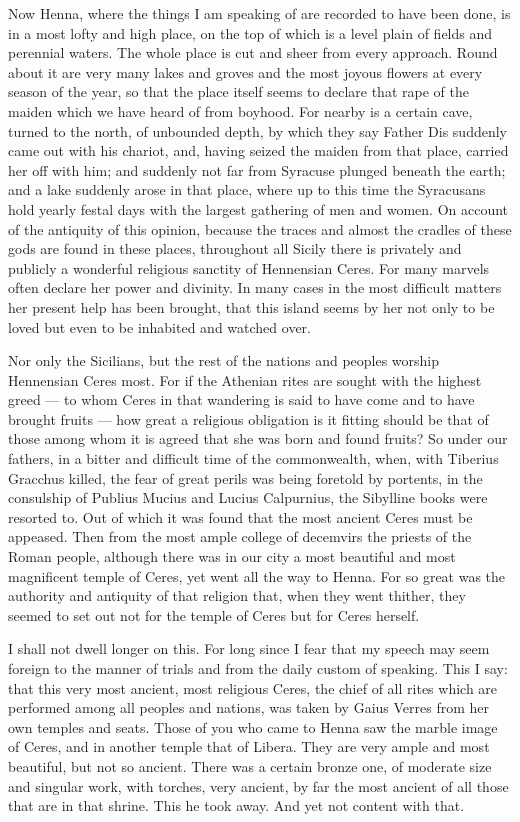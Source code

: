  Now Henna, where the things I am speaking of are recorded to have been done, is in a most lofty and high place, on the top of which is a level plain of fields and perennial waters. The whole place is cut and sheer from every approach. Round about it are very many lakes and groves and the most joyous flowers at every season of the year, so that the place itself seems to declare that rape of the maiden which we have heard of from boyhood. For nearby is a certain cave, turned to the north, of unbounded depth, by which they say Father Dis suddenly came out with his chariot, and, having seized the maiden from that place, carried her off with him; and suddenly not far from Syracuse plunged beneath the earth; and a lake suddenly arose in that place, where up to this time the Syracusans hold yearly festal days with the largest gathering of men and women. On account of the antiquity of this opinion, because the traces and almost the cradles of these gods are found in these places, throughout all Sicily there is privately and publicly a wonderful religious sanctity of Hennensian Ceres. For many marvels often declare her power and divinity. In many cases in the most difficult matters her present help has been brought, that this island seems by her not only to be loved but even to be inhabited and watched over.

 Nor only the Sicilians, but the rest of the nations and peoples worship Hennensian Ceres most. For if the Athenian rites are sought with the highest greed --- to whom Ceres in that wandering is said to have come and to have brought fruits --- how great a religious obligation is it fitting should be that of those among whom it is agreed that she was born and found fruits? So under our fathers, in a bitter and difficult time of the commonwealth, when, with Tiberius Gracchus killed, the fear of great perils was being foretold by portents, in the consulship of Publius Mucius and Lucius Calpurnius, the Sibylline books were resorted to. Out of which it was found that the most ancient Ceres must be appeased. Then from the most ample college of decemvirs the priests of the Roman people, although there was in our city a most beautiful and most magnificent temple of Ceres, yet went all the way to Henna. For so great was the authority and antiquity of that religion that, when they went thither, they seemed to set out not for the temple of Ceres but for Ceres herself.

 I shall not dwell longer on this. For long since I fear that my speech may seem foreign to the manner of trials and from the daily custom of speaking. This I say: that this very most ancient, most religious Ceres, the chief of all rites which are performed among all peoples and nations, was taken by Gaius Verres from her own temples and seats. Those of you who came to Henna saw the marble image of Ceres, and in another temple that of Libera. They are very ample and most beautiful, but not so ancient. There was a certain bronze one, of moderate size and singular work, with torches, very ancient, by far the most ancient of all those that are in that shrine. This he took away. And yet not content with that.

